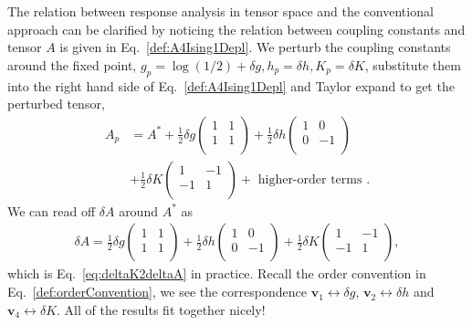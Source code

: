 \documentclass[aps,prb,reprint,superscriptaddress]{revtex4-2}
\begin{document}
The relation between response analysis in tensor space and the
conventional approach can be clarified by noticing the relation between
coupling constants and tensor $A$ is given in
Eq.~\eqref{def:A4Ising1Depl}. We perturb the coupling constants around
the fixed point, $g_p = \log{(1/2)} + \delta g, h_p = \delta h, K_p =
\delta K$, substitute them into the right hand side of
Eq.~\eqref{def:A4Ising1Depl} and Taylor expand to get the perturbed
tensor,
%
\begin{align}\label{eq:Apert4Ising1D}
    A_p &= A^* + \frac{1}{2} \delta g
    \begin{pmatrix}
    1 & 1 \\
    1 & 1 \\
    \end{pmatrix}
    + \frac{1}{2} \delta h
    \begin{pmatrix}
    1 & 0 \\
    0 & -1 \\
    \end{pmatrix} \nonumber\\
    &+ \frac{1}{2} \delta K
    \begin{pmatrix}
    1 & -1 \\
    -1 & 1 \\
    \end{pmatrix}
    + \text{ higher-order terms }.
\end{align}
%
We can read off $\delta A$ around $A^*$ as
%
\begin{align}\label{eq:deltaA4Ising1D}
    \delta A = \frac{1}{2} \delta g
    \begin{pmatrix}
    1 & 1 \\
    1 & 1 \\
    \end{pmatrix}
    + \frac{1}{2} \delta h
    \begin{pmatrix}
    1 & 0 \\
    0 & -1 \\
    \end{pmatrix} 
    + \frac{1}{2} \delta K
    \begin{pmatrix}
    1 & -1 \\
    -1 & 1 \\
    \end{pmatrix},
\end{align}
%
which is Eq.~\eqref{eq:deltaK2deltaA} in practice. Recall the order
convention in Eq.~\eqref{def:orderConvention}, we see the correspondence
$\mathbf{v}_1 \leftrightarrow \delta g$, $\mathbf{v}_2 \leftrightarrow
\delta h$ and $\mathbf{v}_4 \leftrightarrow \delta K$. All of the
results fit together nicely! 
%
\end{document}
